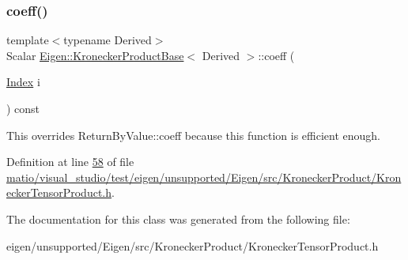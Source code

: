 \subsubsection{\texorpdfstring{coeff()}{coeff()}\hspace{0.1cm}{\footnotesize\ttfamily [4/4]}}
{\footnotesize\ttfamily template$<$typename Derived$>$ \\
Scalar \hyperlink{class_eigen_1_1_kronecker_product_base}{Eigen\+::\+Kronecker\+Product\+Base}$<$ Derived $>$\+::coeff (\begin{DoxyParamCaption}\item[{\hyperlink{namespace_eigen_a62e77e0933482dafde8fe197d9a2cfde}{Index}}]{i }\end{DoxyParamCaption}) const\hspace{0.3cm}{\ttfamily [inline]}}

This overrides Return\+By\+Value\+::coeff because this function is efficient enough. 

Definition at line \hyperlink{matio_2visual__studio_2test_2eigen_2unsupported_2_eigen_2src_2_kronecker_product_2_kronecker_tensor_product_8h_source_l00058}{58} of file \hyperlink{matio_2visual__studio_2test_2eigen_2unsupported_2_eigen_2src_2_kronecker_product_2_kronecker_tensor_product_8h_source}{matio/visual\+\_\+studio/test/eigen/unsupported/\+Eigen/src/\+Kronecker\+Product/\+Kronecker\+Tensor\+Product.\+h}.



The documentation for this class was generated from the following file\+:\begin{DoxyCompactItemize}
\item 
eigen/unsupported/\+Eigen/src/\+Kronecker\+Product/\+Kronecker\+Tensor\+Product.\+h\end{DoxyCompactItemize}
